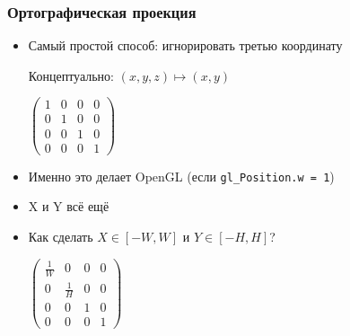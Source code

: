 \documentclass{beamer}
\begin{document}
\begin{frame}[fragile]
\frametitle{Ортографическая проекция}
\begin{itemize}
\item Самый простой способ: \pause игнорировать третью координату
\begin{center}Концептуально: \begin{math}(x, y, z) \mapsto (x, y)\end{math}\end{center}
\begin{center}
\begin{math}
\begin{pmatrix}
1 & 0 & 0 & 0 \\
0 & 1 & 0 & 0 \\
0 & 0 & 1 & 0 \\
0 & 0 & 0 & 1
\end{pmatrix}
\end{math}
\end{center}
\pause
\item Именно это делает OpenGL (если \verb|gl_Position.w = 1|)
\pause
\item X и Y всё ещё \begin{math}[-1, 1]\end{math}
\pause
\item Как сделать \begin{math}X \in [-W, W]\end{math} и \begin{math}Y \in [-H, H]\end{math}?
\pause
\begin{center}
\begin{math}
\begin{pmatrix}
\frac{1}{W} & 0 & 0 & 0 \\
0 & \frac{1}{H} & 0 & 0 \\
0 & 0 & 1 & 0 \\
0 & 0 & 0 & 1
\end{pmatrix}
\end{math}
\end{center}
\end{itemize}
\end{frame}
\end{document}
